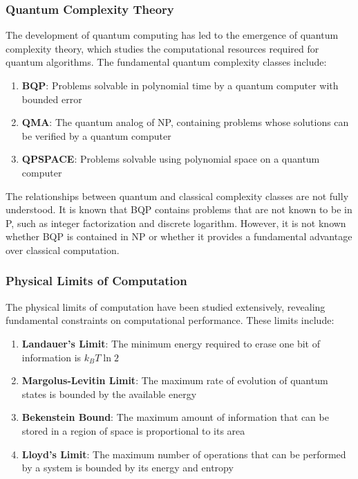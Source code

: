 \documentclass[12pt,a4paper]{article}
\theoremstyle{definition}
\begin{document}
{\subsubsection{Quantum Complexity Theory}

The development of quantum computing has led to the emergence of quantum complexity theory, which studies the computational resources required for quantum algorithms. The fundamental quantum complexity classes include:

\begin{enumerate}
\item \textbf{BQP}: Problems solvable in polynomial time by a quantum computer with bounded error
\item \textbf{QMA}: The quantum analog of NP, containing problems whose solutions can be verified by a quantum computer
\item \textbf{QPSPACE}: Problems solvable using polynomial space on a quantum computer
\end{enumerate}

The relationships between quantum and classical complexity classes are not fully understood. It is known that BQP contains problems that are not known to be in P, such as integer factorization and discrete logarithm. However, it is not known whether BQP is contained in NP or whether it provides a fundamental advantage over classical computation.

\subsubsection{Physical Limits of Computation}

The physical limits of computation have been studied extensively, revealing fundamental constraints on computational performance. These limits include:

\begin{enumerate}
\item \textbf{Landauer's Limit}: The minimum energy required to erase one bit of information is $k_B T \ln 2$ \cite{landauer1961irreversibility}
\item \textbf{Margolus-Levitin Limit}: The maximum rate of evolution of quantum states is bounded by the available energy \cite{margolus1998maximum}
\item \textbf{Bekenstein Bound}: The maximum amount of information that can be stored in a region of space is proportional to its area \cite{bekenstein1981universal}
\item \textbf{Lloyd's Limit}: The maximum number of operations that can be performed by a system is bounded by its energy and entropy \cite{lloyd2000ultimate}
\end{enumerate}

}
\end{document}
